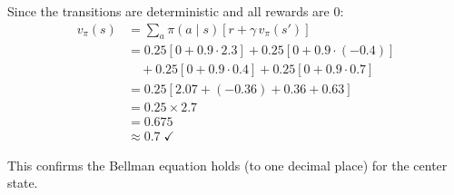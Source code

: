 \documentclass[11pt]{article}
\begin{document}
Since the transitions are deterministic and all rewards are 0:
\begin{align*}
    v_\pi(s) &= \sum_{a} \pi(a \mid s) \left[ r + \gamma\, v_\pi(s') \right] \\[6pt]
             &= 0.25 \left[ 0 + 0.9 \cdot 2.3 \right]
              + 0.25 \left[ 0 + 0.9 \cdot (-0.4) \right] \\
             &\quad + 0.25 \left[ 0 + 0.9 \cdot 0.4 \right]
              + 0.25 \left[ 0 + 0.9 \cdot 0.7 \right] \\[6pt]
             &= 0.25 \left[ 2.07 + (-0.36) + 0.36 + 0.63 \right] \\[4pt]
             &= 0.25 \times 2.7 \\[4pt]
             &= 0.675 \\[4pt]
             &\approx \boxed{0.7} \;\checkmark
\end{align*}

This confirms the Bellman equation holds (to one decimal place) for the center state.
\end{document}
